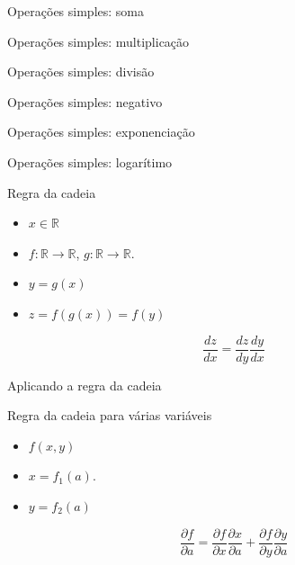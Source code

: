\documentclass[10pt]{beamer}
\begin{document}
\begin{frame}{Operações simples: soma}

\end{frame}

\begin{frame}{Operações simples: multiplicação}

\end{frame}

\begin{frame}{Operações simples: divisão}

\end{frame}

\begin{frame}{Operações simples: negativo}

\end{frame}

\begin{frame}{Operações simples: exponenciação}

\end{frame}

\begin{frame}{Operações simples: logarítimo}

\end{frame}

\begin{frame}{Regra da cadeia}
\Large{
\begin{itemize}
\item $x \in \mathbb{R}$
\item $f:\mathbb{R} \rightarrow\mathbb{R}$, $g:\mathbb{R} \rightarrow\mathbb{R}$. 
\item $y = g(x)$
\item $z = f(g(x)) = f(y)$
\end{itemize}
\[
\frac{dz}{dx} = \frac{dz}{dy} \frac{dy}{dx} 
\]
}
\end{frame}


\begin{frame}{Aplicando a regra da cadeia}

\end{frame}

\begin{frame}{Regra da cadeia para várias variáveis}
\Large{
\begin{itemize}
\item $f(x,y)$
\item $x = f_{1}(a)$. 
\item $y = f_{2}(a)$
\end{itemize}
\[
\frac{\partial f}{ \partial a} = \frac{\partial f}{\partial x} \frac{\partial x}{\partial a} + \frac{\partial f}{\partial y} \frac{\partial y}{\partial a} 
\]
}
\end{frame}
\end{document}
